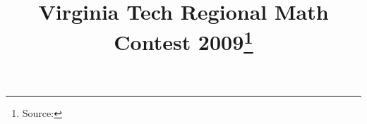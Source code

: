 \documentclass[10pt]{article}
\begin{document}
\title{Virginia Tech Regional Math Contest 2009\footnote{Source: \source}}
\author{\vspace{-2ex}}
\date{\vspace{-6ex}} %
\maketitle







\end{document}
